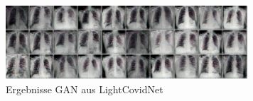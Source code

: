 \begin{figure}[H]
	\centering
	\includegraphics[width=9cm]{kapitel/2_stand_der_technik/img/light-covid-net-ergebnisse.png}
	\caption{Ergebnisse GAN aus LightCovidNet \cite{inspiration-dc-gan-med}}
\end{figure}


